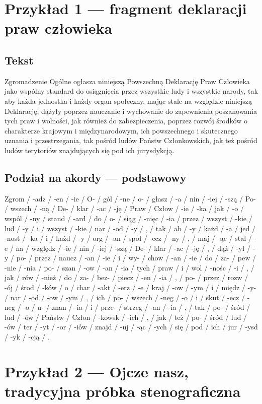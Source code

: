 \documentclass[12p, oneside]{book}
\begin{document}
\section{Przykład 1 --- fragment deklaracji praw człowieka}
\subsection{Tekst}

Zgromadzenie Ogólne ogłasza niniejszą Powszechną Deklarację Praw Człowieka jako
wspólny standard do osiągnięcia przez wszystkie ludy i wszystkie narody, tak aby
każda jednostka i każdy organ społeczny, mając stale na względzie niniejszą
Deklarację, dążyły poprzez nauczanie i wychowanie do zapewnienia poszanowania
tych praw i wolności, jak również do zabezpieczenia, poprzez rozwój środków o
charakterze krajowym i międzynarodowym, ich powszechnego i skutecznego uznania
i przestrzegania, tak pośród ludów Państw Członkowskich, jak też pośród ludów
terytoriów znajdujących się pod ich jurysdykcją. 

\subsection{Podział na akordy --- podstawowy}
Zgrom  /  -adz / -en / -ie / O- / gól / -ne / o- / głasz / -a / nin / -iej /
-szą / Po- / wszech / -ną / De- / klar / -ac / -ję / Praw / Człow / -ie / -ka /
jak / -o / wspól / -ny / stand / -ard / do / o- / siąg / -nięc / -ia / przez /
wszyst / -kie / lud / -y / i / wszyst / -kie / nar / -od / -y / , / tak / ab /
-y / każd / -a / jed / -nost / -ka / i / każd / -y / org / -an / społ / -ecz /
-ny / , / maj / -ąc / stal / -e / na / względz / -ie / nin / -iej / -szą / De- /
klar / -ac / -ję / , / dąż / -ył / -y / po- / przez / naucz / -an / -ie / i /
wy- / chow / -an / -ie / do / za- / pew / -nie / -nia / po- / szan / -ow / -an /
-ia / tych / praw / i / wol / -nośc / -i / , / jak / rów / -nież / do / za- /
bez- / piecz / -en / -ia / , / po- / przez / rozw / -ój / środ / -ków / o /
char / -akt / -erz / -e / kraj / -ow / -ym / i / międz / -y- / nar / -od / -ow /
-ym / , / ich / po- / wszech / -neg / -o / i / skut / -ecz / -neg / -o / u- /
znan / -ia / i / prze- / strzeg / -an / -ia / , / tak / po- / śród / lud / -ów /
Państw / Człon / -kowsk / -ich / , / jak / też / po- / śród / lud / -ów / ter /
-yt / -or / -iów / znajd / -uj / -ąc / -ych / się / pod / ich / jur / -ysd /
-yk / -cją / . 

\section{Przykład 2 --- Ojcze nasz, tradycyjna próbka stenograficzna}
\end{document}
